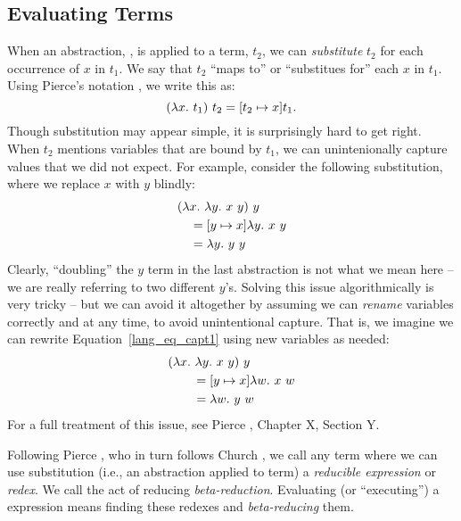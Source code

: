 \documentclass[12pt]{report}
\begin{document}
\subsection{Evaluating \LamA Terms}
\label{lang_sec1_eval}

When an abstraction, , is applied to a term, $t_2$, we
can \emph{substitute} $t_2$ for each occurrence of $x$ in $t_1$. We say
that $t_2$ ``maps to'' or ``substitues for'' each $x$ in $t_1$. Using
Pierce's notation \citep{PierceXX}, we write this as:
\begin{equation}
  (\lambda x.\ t_1)\ t_2 = [t_2 \mapsto x] t_1.
\end{equation}
Though substitution may appear simple, it is surprisingly hard to get
right. When $t_2$ mentions variables that are bound by $t_1$, we can
unintenionally capture values that we did not expect. For example,
consider the following substitution, where we replace $x$ with $y$
blindly:
\begin{equation}
  \begin{split}
    & (\lambda x.\ \lambda y.\ x\ y)\ y \\
    & \quad = [y \mapsto x] \lambda y.\ x\ y \\
    & \quad = \lambda y.\ y\ y
  \end{split}
\label{lang_eq_capt1}
\end{equation}
Clearly, ``doubling'' the $y$ term in the last abstraction is not what
we mean here -- we are really referring to two different
$y$'s. Solving this issue algorithmically is very tricky -- but we can
avoid it altogether by assuming we can \emph{rename} variables
correctly and at any time, to avoid unintentional capture. That is, we
imagine we can rewrite Equation~\ref{lang_eq_capt1} using new
variables as needed:
\begin{equation}
  \begin{split}
    & (\lambda x.\ \lambda y.\ x\ y)\ y \\
    & \qquad = [y \mapsto x] \lambda w.\ x\ w \\
    & \qquad = \lambda w.\ y\ w
  \end{split}
\label{lang_eq_capt2}
\end{equation}
For a full treatment of this issue, see Pierce \citep{PierceXX},
Chapter X, Section Y.

Following Pierce \citep{PierceXX}, who in turn follows Church
\citep{ChurchXX}, we call any term where we can use substitution
(i.e., an abstraction applied to term) a \emph{reducible expression}
or \emph{redex}. We call the act of reducing
\emph{beta-reduction}. Evaluating (or ``executing'') a \lamA
expression means finding these redexes and \emph{beta-reducing} them.
\end{document}
